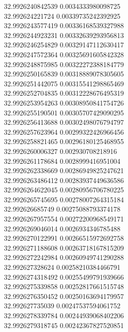 {32.9926240842539	0.0034333980098725\\
32.992624221724	0.00339735242392925\\
32.9926243577419	0.00336168539327988\\
32.9926244923231	0.00332639293956813\\
32.9926246254829	0.00329147112630417\\
32.9926247572364	0.00325691605842328\\
32.9926248875985	0.00322272388184779\\
32.9926250165839	0.00318889078305605\\
32.9926251442075	0.00315541298865469\\
32.9926252704835	0.00312228676495319\\
32.9926253954263	0.00308950841754726\\
32.9926255190501	0.00305707429090295\\
32.9926256413688	0.00302498076794797\\
32.9926257623964	0.00299322426966456\\
32.9926258821465	0.00296180125468955\\
32.9926260006327	0.002930708218916\\
32.9926261178684	0.0028999416951004\\
32.9926262338669	0.00286949825247621\\
32.9926263486412	0.00283937449636586\\
32.9926264622045	0.00280956706780225\\
32.9926265745695	0.00278007264315184\\
32.992626685749	0.00275088793374178\\
32.9926267957554	0.00272200968549171\\
32.9926269046014	0.0026934346785488\\
32.9926270122991	0.00266515972692758\\
32.9926271188608	0.00263718167815209\\
32.9926272242984	0.00260949741290288\\
32.992627328624	0.00258210384466791\\
32.9926274318492	0.00255499791939666\\
32.9926275339858	0.00252817661515748\\
32.9926276350452	0.00250163694179957\\
32.992627735039	0.00247537594061752\\
32.9926278339784	0.00244939068402206\\
32.9926279318745	0.00242367827520851\\
}
